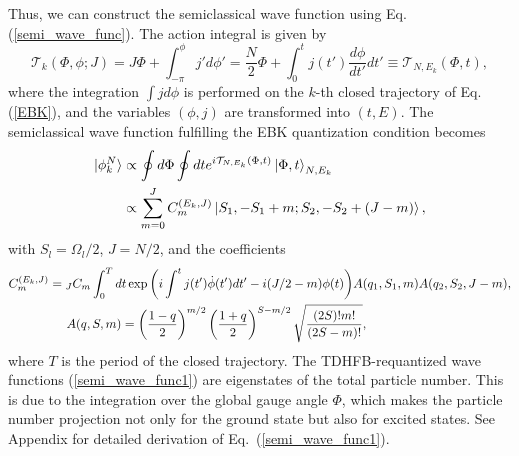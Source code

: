 \documentclass[%
superscriptaddress,
preprint,
showpacs,
nofootinbib,
amsmath,amssymb,
prc,
floatfix ]%
{revtex4-1}
\begin{document}
Thus, we can construct the semiclassical wave function using
Eq. (\ref{semi_wave_func}).
The action integral is given by
\begin{equation}
	\mathcal{T}_k(\Phi,\phi;J)
	= J\Phi + \int^\phi_{-\pi} j' d\phi' 
	= \frac{N}{2}\Phi + \int^t_0   %
	j(t') \frac{d\phi}{dt'} dt' 
\equiv \mathcal{T}_{N,E_k}(\Phi,t) ,
\end{equation}
where the integration $\int j d\phi$ is performed on the $k$-th
closed trajectory of Eq. (\ref{EBK}), and
the variables $(\phi,j)$ are transformed into $(t,E)$.
The semiclassical wave function fulfilling the EBK quantization condition
becomes
\begin{align}
	\ket{\phi_k^N} &\propto \oint d\Phi \oint dt
	e^{i\mathcal{T}_{N,E_k}(\Phi, t)}
	\ket{\Phi,t}_{N,E_k} \nonumber \\
  &\propto \sum_{m=0}^{J}C_m^{(E_k,J)}\ket{S_1,-S_1+m;S_2,-S_2+(J-m)} ,
	\label{semi_wave_func1}
\end{align}
with $S_l=\Omega_l/2$, $J=N/2$, and the coefficients
\begin{align}
  C_m^{(E_k,J)} &= {}_J C_m\int_0^T dt \exp{\left( i\int^t j(t') \dot{\phi}(t') dt'-i(J/2-m)\phi(t) \right)}A(q_1,S_1,m)A(q_2,S_2,J-m) ,\\
  & \hspace{5mm} A(q,S,m) = \left(\frac{1-q}{2}\right)^{m/2}\left(\frac{1+q}{2}\right)^{S-m/2}\sqrt{\frac{(2S)!m!}{(2S-m)!}}, \hspace{5mm} \nonumber
\end{align}
where $T$ is the period of the closed trajectory.
The TDHFB-requantized wave functions (\ref{semi_wave_func1}) are
eigenstates of the total particle number.
This is due to the integration over the global gauge angle $\Phi$,
which makes the particle number projection not only for the ground state
but also for excited states.
See Appendix for detailed derivation of Eq.~(\ref{semi_wave_func1}). 
\end{document}
